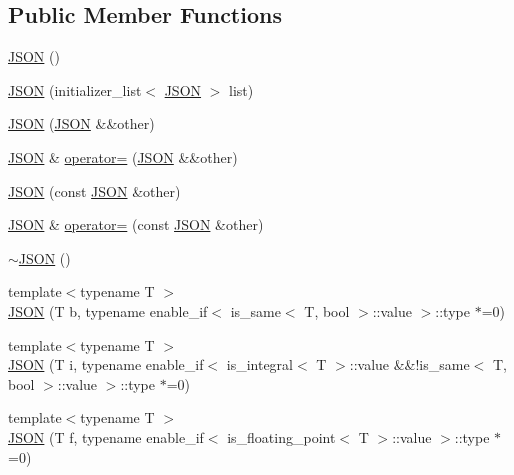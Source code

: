 \subsection*{Public Member Functions}
\begin{DoxyCompactItemize}
\item 
\mbox{\hyperlink{classjson_1_1_j_s_o_n_a0334c8643ae2a6cd86020e02643bb20f}{J\+S\+ON}} ()
\item 
\mbox{\hyperlink{classjson_1_1_j_s_o_n_acada0833f1b9fb6974610c031b6eabe7}{J\+S\+ON}} (initializer\+\_\+list$<$ \mbox{\hyperlink{classjson_1_1_j_s_o_n}{J\+S\+ON}} $>$ list)
\item 
\mbox{\hyperlink{classjson_1_1_j_s_o_n_aff59b496d6cebc650355071d32c62edb}{J\+S\+ON}} (\mbox{\hyperlink{classjson_1_1_j_s_o_n}{J\+S\+ON}} \&\&other)
\item 
\mbox{\hyperlink{classjson_1_1_j_s_o_n}{J\+S\+ON}} \& \mbox{\hyperlink{classjson_1_1_j_s_o_n_ab22885428262d4ed0a95c50d5537b13e}{operator=}} (\mbox{\hyperlink{classjson_1_1_j_s_o_n}{J\+S\+ON}} \&\&other)
\item 
\mbox{\hyperlink{classjson_1_1_j_s_o_n_ab147ef429a76d7087fcd7d60ea067405}{J\+S\+ON}} (const \mbox{\hyperlink{classjson_1_1_j_s_o_n}{J\+S\+ON}} \&other)
\item 
\mbox{\hyperlink{classjson_1_1_j_s_o_n}{J\+S\+ON}} \& \mbox{\hyperlink{classjson_1_1_j_s_o_n_ac60d87eca03625eb071fb0c98febbb97}{operator=}} (const \mbox{\hyperlink{classjson_1_1_j_s_o_n}{J\+S\+ON}} \&other)
\item 
\mbox{\hyperlink{classjson_1_1_j_s_o_n_ae67662933b6cc74a8ee6354448874724}{$\sim$\+J\+S\+ON}} ()
\item 
{\footnotesize template$<$typename T $>$ }\\\mbox{\hyperlink{classjson_1_1_j_s_o_n_a8720f6a983f53220b3aa3bb9a461edad}{J\+S\+ON}} (T b, typename enable\+\_\+if$<$ is\+\_\+same$<$ T, bool $>$\+::value $>$\+::type $\ast$=0)
\item 
{\footnotesize template$<$typename T $>$ }\\\mbox{\hyperlink{classjson_1_1_j_s_o_n_af9f080d1de172bc533f9ae49e391f5bf}{J\+S\+ON}} (T i, typename enable\+\_\+if$<$ is\+\_\+integral$<$ T $>$\+::value \&\&!is\+\_\+same$<$ T, bool $>$\+::value $>$\+::type $\ast$=0)
\item 
{\footnotesize template$<$typename T $>$ }\\\mbox{\hyperlink{classjson_1_1_j_s_o_n_aef0009e7c670dfd4a83e39fa1505da55}{J\+S\+ON}} (T f, typename enable\+\_\+if$<$ is\+\_\+floating\+\_\+point$<$ T $>$\+::value $>$\+::type $\ast$=0)

\end{DoxyCompactItemize}
